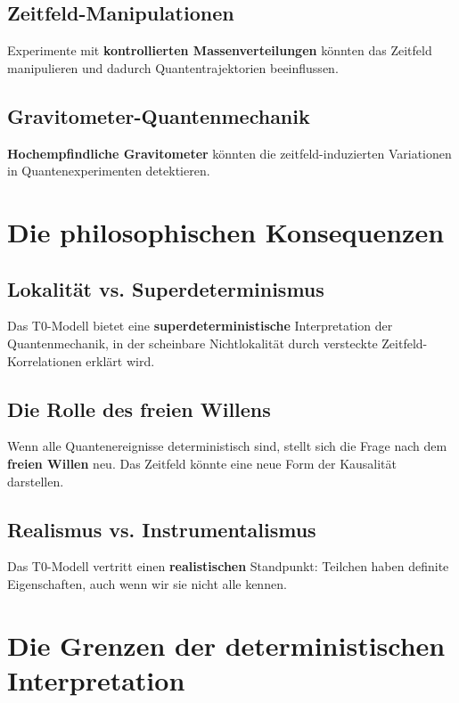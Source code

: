 \documentclass[12pt,a4paper]{report}
\begin{document}
	\subsection{Zeitfeld-Manipulationen}
	
	Experimente mit \textbf{kontrollierten Massenverteilungen} könnten das Zeitfeld manipulieren und dadurch Quantentrajektorien beeinflussen.
	
	\subsection{Gravitometer-Quantenmechanik}
	
	\textbf{Hochempfindliche Gravitometer} könnten die zeitfeld-induzierten Variationen in Quantenexperimenten detektieren.
	
	\section{Die philosophischen Konsequenzen}
	
	\subsection{Lokalität vs. Superdeterminismus}
	
	Das T0-Modell bietet eine \textbf{superdeterministische} Interpretation der Quantenmechanik, in der scheinbare Nichtlokalität durch versteckte Zeitfeld-Korrelationen erklärt wird.
	
	\subsection{Die Rolle des freien Willens}
	
	Wenn alle Quantenereignisse deterministisch sind, stellt sich die Frage nach dem \textbf{freien Willen} neu. Das Zeitfeld könnte eine neue Form der Kausalität darstellen.
	
	\subsection{Realismus vs. Instrumentalismus}
	
	Das T0-Modell vertritt einen \textbf{realistischen} Standpunkt: Teilchen haben definite Eigenschaften, auch wenn wir sie nicht alle kennen.
	
	\section{Die Grenzen der deterministischen Interpretation}
	
\end{document}
